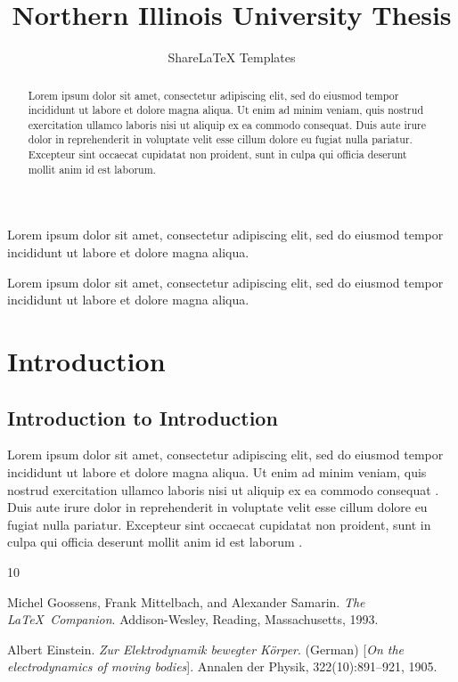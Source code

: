 \documentclass[12pt]{niuthesis}
\title{Northern Illinois University Thesis}
\author{ShareLaTeX Templates}
\begin{document}
\begin{abstract}
Lorem ipsum dolor sit amet, consectetur adipiscing elit, sed do eiusmod tempor incididunt ut labore et dolore magna aliqua. Ut enim ad minim veniam, quis nostrud exercitation ullamco laboris nisi ut aliquip ex ea commodo consequat. Duis aute irure dolor in reprehenderit in voluptate velit esse cillum dolore eu fugiat nulla pariatur. Excepteur sint occaecat cupidatat non proident, sunt in culpa qui officia deserunt mollit anim id est laborum.
\end{abstract}

\begin{dedication}
Lorem ipsum dolor sit amet, consectetur adipiscing elit, sed do eiusmod tempor incididunt ut labore et dolore magna aliqua.
\end{dedication}

\begin{acknowledgements}
Lorem ipsum dolor sit amet, consectetur adipiscing elit, sed do eiusmod tempor incididunt ut labore et dolore magna aliqua.
\end{acknowledgements}

\MakeThesisPrologue

\chapter{Introduction}
\section{Introduction to Introduction}
Lorem ipsum dolor sit amet, consectetur adipiscing elit, sed do eiusmod tempor incididunt ut labore et dolore magna aliqua. Ut enim ad minim veniam, quis nostrud exercitation ullamco laboris nisi ut aliquip ex ea commodo consequat \cite{latexcompanion}. Duis aute irure dolor in reprehenderit in voluptate velit esse cillum dolore eu fugiat nulla pariatur. Excepteur sint occaecat cupidatat non proident, sunt in culpa qui officia deserunt mollit anim id est laborum \cite{einstein}.

\begin{thebibliography}{10}

 Michel Goossens, Frank Mittelbach, and Alexander Samarin. \textit{The \LaTeX\ Companion}. Addison-Wesley, Reading, Massachusetts, 1993.

 Albert Einstein. \textit{Zur Elektrodynamik bewegter K{\"o}rper}. (German) [\textit{On the electrodynamics of moving bodies}]. Annalen der Physik, 322(10):891–921, 1905.

\end{thebibliography}
\end{document}
